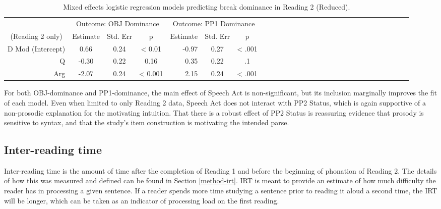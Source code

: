 \documentclass[11pt,oneside]{book}
\begin{document}
\begin{table}[!h]

\caption{\label{tab:r2dom}Mixed effects logistic regression models predicting break dominance in Reading 2 (Reduced).}
\centering
\begin{tabular}{rcccrcccrcccrcccrcccrcccrccc}
\toprule
\multicolumn{1}{c}{ } & \multicolumn{3}{c}{Outcome: OBJ Dominance} & \multicolumn{3}{c}{Outcome: PP1 Dominance} \\
\cmidrule(l{3pt}r{3pt}){2-4} \cmidrule(l{3pt}r{3pt}){5-7}
\multicolumn{1}{c}{(Reading 2 only)} & \multicolumn{1}{c}{Estimate} & \multicolumn{1}{c}{Std. Err} & \multicolumn{1}{c}{p} & \multicolumn{1}{c}{Estimate} & \multicolumn{1}{c}{Std. Err} & \multicolumn{1}{c}{p}\\
\midrule
D Mod (Intercept) & 0.66 & 0.24 & < 0.01 & -0.97 & 0.27 & < .001\\
Q & -0.30 & 0.22 & 0.16 & 0.35 & 0.22 & .1\\
Arg & -2.07 & 0.24 & < 0.001 & 2.15 & 0.24 & < .001\\
\bottomrule
\end{tabular}
\end{table}

For both OBJ-dominance and PP1-dominance, the main effect of Speech Act is non-significant, but its inclusion marginally improves the fit of each model. Even when limited to only Reading 2 data, Speech Act does not interact with PP2 Status, which is again supportive of a non-prosodic explanation for the motivating intuition. That there is a robust effect of PP2 Status is reassuring evidence that prosody is sensitive to syntax, and that the study's item construction is motivating the intended parse.

\hypertarget{irt}{%
\subsection{Inter-reading time}\label{irt}}

Inter-reading time is the amount of time after the completion of Reading 1 and before the beginning of phonation of Reading 2. The details of how this was measured and defined can be found in Section \ref{method-irt}. IRT is meant to provide an estimate of how much difficulty the reader has in processing a given sentence. If a reader spends more time studying a sentence prior to reading it aloud a second time, the IRT will be longer, which can be taken as an indicator of processing load on the first reading.
\end{document}
